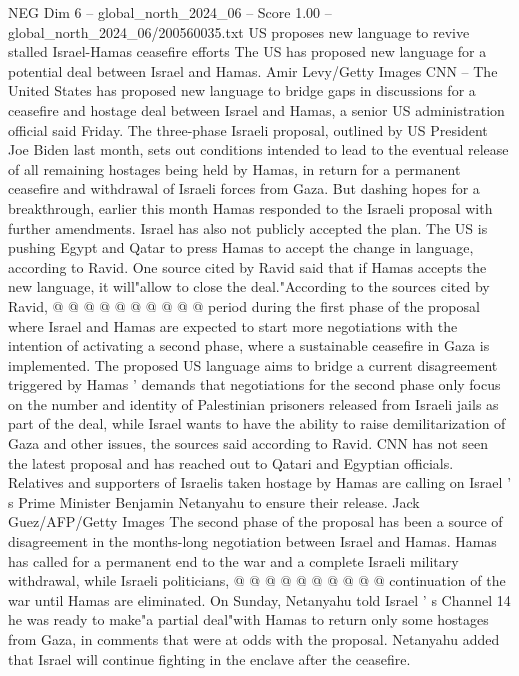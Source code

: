 \begin{textsample}{NEG Dim 6 – global\_north\_2024\_06 – Score 1.00 – global\_north\_2024\_06/200560035.txt}  \label{ex:f6_neg_316}
US proposes new language to revive stalled Israel-Hamas ceasefire efforts The US has proposed new language for a potential deal between Israel and Hamas.
Amir Levy/Getty Images CNN -- The United States has proposed new language to bridge gaps in discussions for a ceasefire and hostage deal between Israel and Hamas, a senior US administration official said Friday.
The three-phase Israeli proposal, outlined by US President Joe Biden last month, sets out conditions intended to lead to the eventual release of all remaining hostages being held by Hamas, in return for a permanent ceasefire and withdrawal of Israeli forces from Gaza.
But dashing hopes for a breakthrough, earlier this month Hamas responded to the Israeli proposal with further amendments.
Israel has also not publicly accepted the plan.
The US is pushing Egypt and Qatar to press Hamas to accept the change in language, according to Ravid.
One source cited by Ravid said that if Hamas accepts the new language, it will"allow to close the deal."According to the sources cited by Ravid, @ @ @ @ @ @ @ @ @ @ period during the first phase of the proposal where Israel and Hamas are expected to start more negotiations with the intention of activating a second phase, where a sustainable ceasefire in Gaza is implemented.
The proposed US language aims to bridge a current disagreement triggered by Hamas ' demands that negotiations for the second phase only focus on the number and identity of Palestinian prisoners released from Israeli jails as part of the deal, while Israel wants to have the ability to raise demilitarization of Gaza and other issues, the sources said according to Ravid.
CNN has not seen the latest proposal and has reached out to Qatari and Egyptian officials.
Relatives and supporters of Israelis taken hostage by Hamas are calling on Israel ' s Prime Minister Benjamin Netanyahu to ensure their release.
Jack Guez/AFP/Getty Images The second phase of the proposal has been a source of disagreement in the months-long negotiation between Israel and Hamas.
Hamas has called for a permanent end to the war and a complete Israeli military withdrawal, while Israeli politicians, @ @ @ @ @ @ @ @ @ @ continuation of the war until Hamas are eliminated.
On Sunday, Netanyahu told Israel ' s Channel 14 he was ready to make"a partial deal"with Hamas to return only some hostages from Gaza, in comments that were at odds with the proposal.
Netanyahu added that Israel will continue fighting in the enclave after the ceasefire.

\end{textsample}
